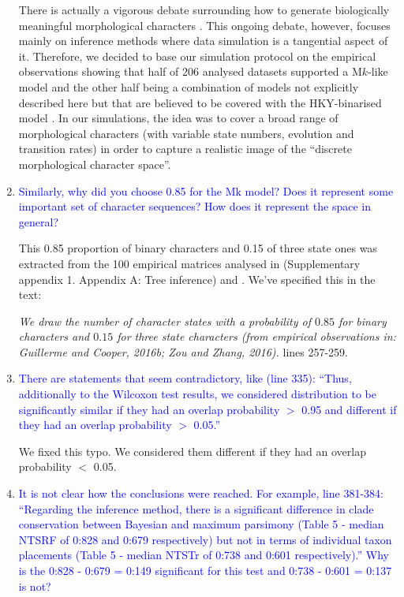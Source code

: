 \documentclass[12pt,letterpaper]{article}
\begin{document}
\begin{enumerate}
There is actually a vigorous debate surrounding how to generate biologically meaningful morphological characters \citep[][]{OReilly20160081,goloboff2017weighted,puttick2017uncertain,GoloboffEmpirical,OReillyEmpirical}.
This ongoing debate, however, focuses mainly on inference methods where data simulation is a tangential aspect of it.
Therefore, we decided to base our simulation protocol on the empirical observations showing that half of 206 analysed datasets supported a M$k$-like model \citep[][Fig. 3]{Wright01072016} and the other half being a combination of models not explicitly described here but that are believed to be covered with the HKY-binarised model \citep{puttick2017uncertain,OReillyEmpirical}.
In our simulations, the idea was to cover a broad range of morphological characters (with variable state numbers, evolution and transition rates) in order to capture a realistic image of the ``discrete morphological character space''.

\item{\textcolor{blue}{Similarly, why did you choose 0.85 for the Mk model? Does it represent some important set of character sequences? How does it represent the space in general?}}

This 0.85 proportion of binary characters and 0.15 of three state ones was extracted from the 100 empirical matrices analysed in \cite{Guillerme2016146} (Supplementary appendix 1. Appendix A: Tree inference) and \cite{ZouConvergence}.
We've specified this in the text:

\textit{We draw the number of character states with a probability of $0.85$ for binary characters and $0.15$ for three state characters (from empirical observations in: Guillerme and Cooper, 2016b; Zou and Zhang, 2016).} lines 257-259.

\item{\textcolor{blue}{There are statements that seem contradictory, like (line 335): ``Thus, additionally to the Wilcoxon test results, we considered distribution to be significantly similar if they had an overlap probability $>$ 0.95 and different if they had an overlap probability $>$ 0.05.''}}

We fixed this typo. We considered them different if they had an overlap probability $<$ 0.05.

\item{\textcolor{blue}{It is not clear how the conclusions were reached. For example, line 381-384: ``Regarding the inference method, there is a significant difference in clade conservation between Bayesian and maximum parsimony (Table 5 - median NTSRF of 0:828 and 0:679 respectively) but not in terms of individual taxon placements (Table 5 - median NTSTr of 0:738 and 0:601 respectively).'' Why is the 0:828 - 0:679 = 0:149 significant for this test and 0:738 - 0:601 = 0:137 is not?}}


\end{enumerate}
\end{document}
